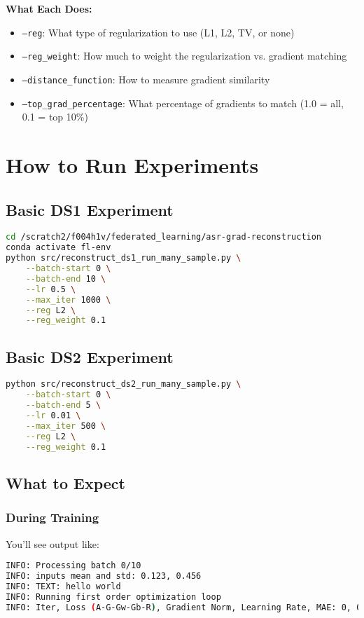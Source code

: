 \documentclass[12pt]{article}
\begin{document}
\textbf{What Each Does:}
\begin{itemize}
    \item \texttt{--reg}: What type of regularization to use (L1, L2, TV, or none)
    \item \texttt{--reg\_weight}: How much to weight the regularization vs. gradient matching
    \item \texttt{--distance\_function}: How to measure gradient similarity
    \item \texttt{--top\_grad\_percentage}: What percentage of gradients to match (1.0 = all, 0.1 = top 10\%)
\end{itemize}

\section{How to Run Experiments}

\subsection{Basic DS1 Experiment}

\begin{lstlisting}[language=bash]
cd /scratch2/f004h1v/federated_learning/asr-grad-reconstruction
conda activate fl-env
python src/reconstruct_ds1_run_many_sample.py \
    --batch-start 0 \
    --batch-end 10 \
    --lr 0.5 \
    --max_iter 1000 \
    --reg L2 \
    --reg_weight 0.1
\end{lstlisting}

\subsection{Basic DS2 Experiment}

\begin{lstlisting}[language=bash]
python src/reconstruct_ds2_run_many_sample.py \
    --batch-start 0 \
    --batch-end 5 \
    --lr 0.01 \
    --max_iter 500 \
    --reg L2 \
    --reg_weight 0.1
\end{lstlisting}

\subsection{What to Expect}

\subsubsection{During Training}
You'll see output like:
\begin{lstlisting}[language=bash]
INFO: Processing batch 0/10
INFO: inputs mean and std: 0.123, 0.456
INFO: TEXT: hello world
INFO: Running first order optimization loop
INFO: Iter, Loss (A-G-Gw-Gb-R), Gradient Norm, Learning Rate, MAE: 0, 0.12345678, 0.1234, 0.5678, 0.0000, 0.1234, 0.5000, 0.1234
\end{lstlisting}
\end{document}
